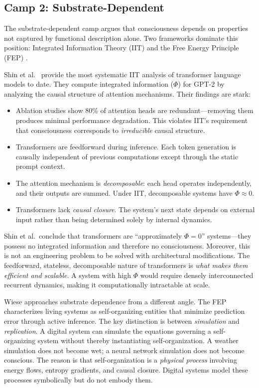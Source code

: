 \subsection{Camp 2: Substrate-Dependent}

The substrate-dependent camp argues that consciousness depends on properties not captured
by functional description alone. Two frameworks dominate this position: Integrated
Information Theory (IIT) \cite{tononi2004information, tononi2016integrated, albantakis2023iit4}
and the Free Energy Principle (FEP) \cite{friston2010free}.

Shin et al.\ \cite{shin2025iit} provide the most systematic IIT analysis of transformer
language models to date. They compute integrated information ($\Phi$) for GPT-2 by analyzing
the causal structure of attention mechanisms. Their findings are stark:

\begin{itemize}[leftmargin=2em]
\item Ablation studies show 80\% of attention heads are redundant---removing them produces
      minimal performance degradation. This violates IIT's requirement that consciousness
      corresponds to \emph{irreducible} causal structure.
\item Transformers are feedforward during inference. Each token generation is causally
      independent of previous computations except through the static prompt context.
\item The attention mechanism is \emph{decomposable}: each head operates independently,
      and their outputs are summed. Under IIT, decomposable systems have $\Phi \approx 0$.
\item Transformers lack \emph{causal closure}. The system's next state depends on external
      input rather than being determined solely by internal dynamics.
\end{itemize}

Shin et al.\ conclude that transformers are ``approximately $\Phi = 0$'' systems---they
possess no integrated information and therefore no consciousness. Moreover, this is not an
engineering problem to be solved with architectural modifications. The feedforward, stateless,
decomposable nature of transformers is \emph{what makes them efficient and scalable}. A
system with high $\Phi$ would require densely interconnected recurrent dynamics, making it
computationally intractable at scale.

Wiese \cite{wiese2024fep} approaches substrate dependence from a different angle. The FEP
characterizes living systems as self-organizing entities that minimize prediction error
through active inference. The key distinction is between \emph{simulation} and
\emph{replication}. A digital system can simulate the equations governing a self-organizing
system without thereby instantiating self-organization. A weather simulation does not become
wet; a neural network simulation does not become conscious. The reason is that
self-organization is a \emph{physical process} involving energy flows, entropy gradients,
and causal closure. Digital systems model these processes symbolically but do not embody them.

